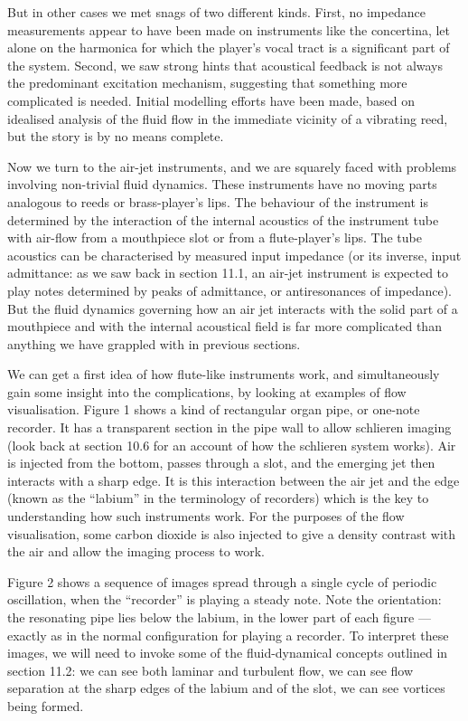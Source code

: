   But in other cases we met snags of two different kinds. First, no impedance 
  measurements appear to have been made on instruments like the concertina, let 
  alone on the harmonica for which the player’s vocal tract is a significant 
  part of the system. Second, we saw strong hints that acoustical feedback is 
  not always the predominant excitation mechanism, suggesting that something 
  more complicated is needed. Initial modelling efforts have been made, based 
  on idealised analysis of the fluid flow in the immediate vicinity of a 
  vibrating reed, but the story is by no means complete. 

  Now we turn to the air-jet instruments, and we are squarely faced with 
  problems involving non-trivial fluid dynamics. These instruments have no 
  moving parts analogous to reeds or brass-player’s lips. The behaviour of the 
  instrument is determined by the interaction of the internal acoustics of the 
  instrument tube with air-flow from a mouthpiece slot or from a flute-player’s 
  lips. The tube acoustics can be characterised by measured input impedance (or 
  its inverse, input admittance: as we saw back in section 11.1, an air-jet 
  instrument is expected to play notes determined by peaks of admittance, or 
  antiresonances of impedance). But the fluid dynamics governing how an air jet 
  interacts with the solid part of a mouthpiece and with the internal 
  acoustical field is far more complicated than anything we have grappled with 
  in previous sections. 


  We can get a first idea of how flute-like instruments work, and 
  simultaneously gain some insight into the complications, by looking at 
  examples of flow visualisation. Figure 1 shows a kind of rectangular organ 
  pipe, or one-note recorder. It has a transparent section in the pipe wall to 
  allow schlieren imaging (look back at section 10.6 for an account of how the 
  schlieren system works). Air is injected from the bottom, passes through a 
  slot, and the emerging jet then interacts with a sharp edge. It is this 
  interaction between the air jet and the edge (known as the ``labium'' in the 
  terminology of recorders) which is the key to understanding how such 
  instruments work. For the purposes of the flow visualisation, some carbon 
  dioxide is also injected to give a density contrast with the air and allow 
  the imaging process to work. 

  Figure 2 shows a sequence of images spread through a single cycle of periodic 
  oscillation, when the “recorder” is playing a steady note. Note the 
  orientation: the resonating pipe lies below the labium, in the lower part of 
  each figure --- exactly as in the normal configuration for playing a 
  recorder. To interpret these images, we will need to invoke some of the 
  fluid-dynamical concepts outlined in section 11.2: we can see both laminar 
  and turbulent flow, we can see flow separation at the sharp edges of the 
  labium and of the slot, we can see vortices being formed. 

